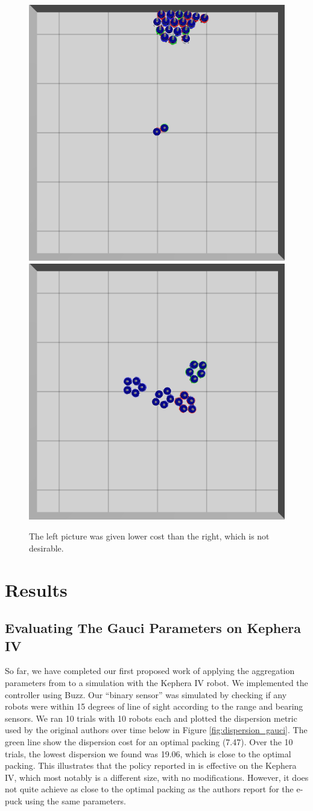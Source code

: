 \documentclass[conference]{IEEEtran}
\begin{document}
  \begin{figure}
    \centering
    \includegraphics[width=0.49\linewidth]{./images/individual_0_gen_0.png}
    \includegraphics[width=0.49\linewidth]{./images/individual_0_gen_1_better.png}
    \caption{The left picture was given lower cost than the right, which is not desirable.}
    \label{fig:cost_function_fuckup}
  \end{figure}
  
  

\section{Results}

  \subsection{Evaluating The Gauci Parameters on Kephera IV}

  So far, we have completed our first proposed work of applying the aggregation parameters from \cite{gauci_self-organized_2014} to a simulation with the Kephera IV robot. We implemented the controller using Buzz. Our ``binary sensor'' was simulated by checking if any robots were within 15 degrees of line of sight according to the range and bearing sensors. We ran 10 trials with 10 robots each and plotted the dispersion metric used by the original authors over time below in Figure \ref{fig:dispersion_gauci}. The green line show the dispersion cost for an optimal packing (7.47). Over the 10 trials, the lowest dispersion we found was 19.06, which is close to the optimal packing. This illustrates that the policy reported in \cite{gauci_self-organized_2014} is effective on the Kephera IV, which most notably is a different size, with no modifications. However, it does not quite achieve as close to the optimal packing as the authors report for the e-puck using the same parameters.
\end{document}
